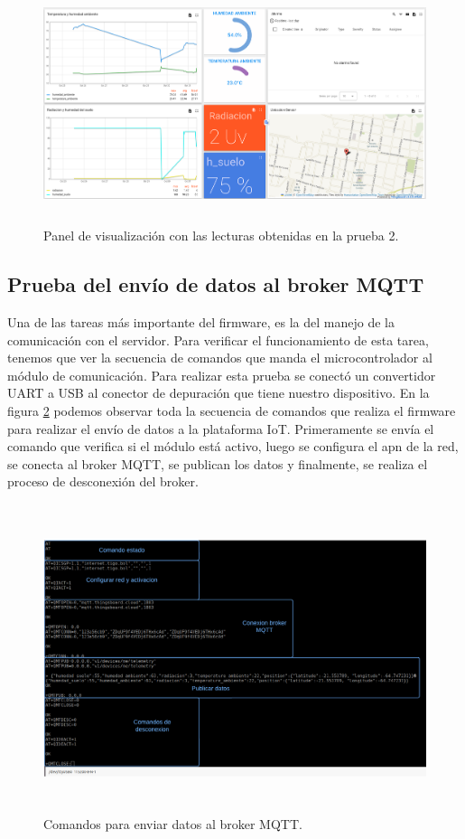 \begin{figure}[h!]
  \centering
    \includegraphics[width=\linewidth, height=7cm]{./Figures/humedad_alta_tb.png}
  \caption{Panel de visualización con las lecturas obtenidas en la prueba 2.}
    \label{fig:Humedad alta ThingsBoard}
\end{figure}

\subsection{Prueba del envío de datos al broker MQTT}
Una de las tareas más importante del firmware, es la del manejo de la comunicación con el servidor. Para verificar el funcionamiento de esta tarea, tenemos que ver la secuencia de comandos que manda el microcontrolador al módulo de comunicación.
Para realizar esta prueba se conectó un convertidor UART a USB al conector de depuración que tiene nuestro dispositivo.
En la figura \ref{fig:secuencia de comandos shell} podemos observar toda la secuencia de comandos que realiza el firmware para realizar el envío de datos a la plataforma IoT. Primeramente se envía el comando que verifica si el módulo está activo, luego se configura el apn de la red, se conecta al broker MQTT, se publican los datos y finalmente, se realiza el proceso de desconexión del broker.

\begin{figure}[h]
  \centering
    \includegraphics[width=12cm, height=9cm]{./Figures/secuencia de comandos shell.png}
  \caption{Comandos para enviar datos al broker MQTT.}
    \label{fig:secuencia de comandos shell}
\end{figure}

